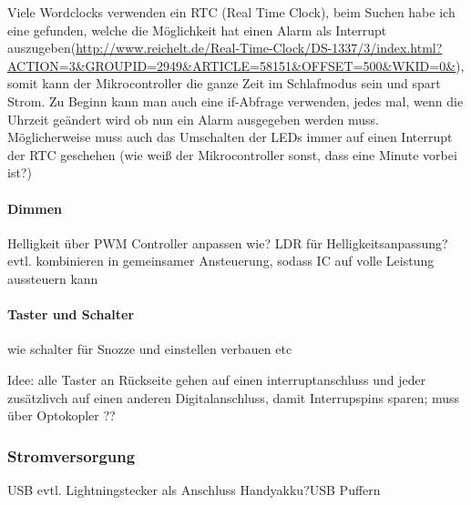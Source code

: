 \documentclass[11pt,a4paper,ngerman]{article}
\begin{document}
Viele Wordclocks verwenden ein RTC (Real Time Clock), beim Suchen habe ich eine gefunden, welche die Möglichkeit hat einen Alarm als Interrupt auszugeben(\url{http://www.reichelt.de/Real-Time-Clock/DS-1337/3/index.html?ACTION=3&GROUPID=2949&ARTICLE=58151&OFFSET=500&WKID=0&}), somit kann der Mikrocontroller die ganze Zeit im Schlafmodus sein und spart Strom. Zu Beginn kann man auch eine if-Abfrage verwenden, jedes mal, wenn die Uhrzeit geändert wird ob nun ein Alarm ausgegeben werden muss. Möglicherweise muss auch das Umschalten der LEDs immer auf einen Interrupt der RTC geschehen (wie weiß der Mikrocontroller sonst, dass eine Minute vorbei ist?)


\paragraph{Dimmen}

Helligkeit über PWM Controller anpassen wie?
LDR für Helligkeitsanpassung? evtl. kombinieren in gemeinsamer Ansteuerung, sodass IC auf volle Leistung aussteuern kann


\paragraph{Taster und Schalter}

wie schalter für Snozze und einstellen verbauen etc

Idee: alle Taster an Rückseite gehen auf einen interruptanschluss und jeder zusätzlivch auf einen anderen Digitalanschluss, damit Interrupspins sparen; muss über Optokopler ??
\subsubsection{Stromversorgung}
USB evtl. Lightningstecker als Anschluss       
Handyakku?USB Puffern\cite{RTCDatenblatt}


\end{document}
